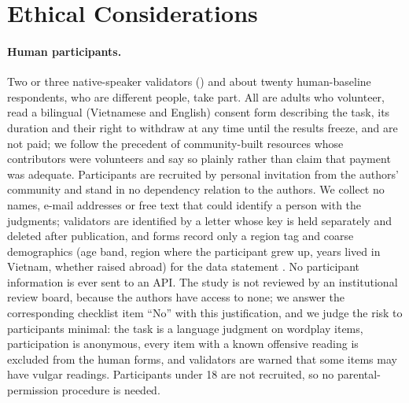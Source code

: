 \section*{Ethical Considerations}

\paragraph{Human participants.}
Two or three native-speaker validators () and about twenty human-baseline respondents, who are different people, take part. All are adults who volunteer, read a bilingual (Vietnamese and English) consent form describing the task, its duration and their right to withdraw at any time until the results freeze, and are not paid; we follow the precedent of community-built resources whose contributors were volunteers \citep{2024-acl-long-620,2020-findings-emnlp-195} and say so plainly rather than claim that payment was adequate. Participants are recruited by personal invitation from the authors' community and stand in no dependency relation to the authors. We collect no names, e-mail addresses or free text that could identify a person with the judgments; validators are identified by a letter whose key is held separately and deleted after publication, and forms record only a region tag and coarse demographics (age band, region where the participant grew up, years lived in Vietnam, whether raised abroad) for the data statement \citep{Q18-1041}. No participant information is ever sent to an API. The study is not reviewed by an institutional review board, because the authors have access to none; we answer the corresponding checklist item ``No'' with this justification, and we judge the risk to participants minimal: the task is a language judgment on wordplay items, participation is anonymous, every item with a known offensive reading is excluded from the human forms, and validators are warned that some items may have vulgar readings. Participants under 18 are not recruited, so no parental-permission procedure is needed.

